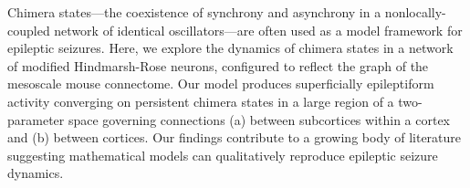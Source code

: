 Chimera states---the coexistence of synchrony and asynchrony in a nonlocally-coupled network of identical oscillators---are often used as a model framework for epileptic seizures.
Here, we explore the dynamics of chimera states in a network of modified Hindmarsh-Rose neurons, configured to reflect the graph of the mesoscale mouse connectome.
Our model produces superficially epileptiform activity converging on persistent chimera states in a large region of a two-parameter space governing connections (a) between subcortices within a cortex and (b) between cortices.
Our findings contribute to a growing body of literature suggesting mathematical models can qualitatively reproduce epileptic seizure dynamics.